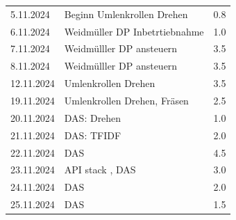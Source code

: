 \begin{longtable}{|l|p{10cm}|r|}
5.11.2024	&Beginn Umlenkrollen Drehen	&0.8\\
6.11.2024	&Weidmüller DP Inbetrtiebnahme&	1.0\\
7.11.2024	&Weidmülller DP ansteuern&	3.5\\
8.11.2024	&Weidmülller DP ansteuern&	3.5\\
12.11.2024	&Umlenkrollen Drehen &	3.5\\
19.11.2024	&Umlenkrollen Drehen, Fräsen	&2.5\\
20.11.2024	&DAS: Drehen	&1.0\\
21.11.2024	&DAS: TFIDF	&2.0\\
22.11.2024	&DAS	&4.5\\
23.11.2024	&API stack , DAS	&3.0\\
24.11.2024	&DAS	&2.0\\
25.11.2024	&DAS	&1.5\\


\end{longtable}
